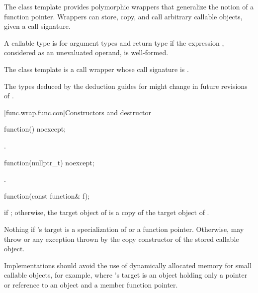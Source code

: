 \pnum
The  class template provides polymorphic wrappers that
generalize the notion of a function pointer. Wrappers can store, copy,
and call arbitrary callable objects, given a call
signature.

\pnum
{}%
A callable type 
is  for argument
types 
and return type 
if the expression
,
considered as an unevaluated operand, is
well-formed.

\pnum
The  class template is a call
wrapper whose call signature
is .

\pnum
\begin{note}
The types deduced by the deduction guides for 
might change in future revisions of \Cpp{}.
\end{note}

[func.wrap.func.con]{Constructors and destructor}

%
\begin{itemdecl}
function() noexcept;
\end{itemdecl}

\begin{itemdescr}
\pnum
\ensures
{}.
\end{itemdescr}

%
\begin{itemdecl}
function(nullptr_t) noexcept;
\end{itemdecl}

\begin{itemdescr}
\pnum
\ensures
{}.
\end{itemdescr}

%
\begin{itemdecl}
function(const function& f);
\end{itemdecl}

\begin{itemdescr}
\pnum
\ensures
{} if ; otherwise,
the target object of  is a copy of the target object of .

\pnum
\throws
Nothing if 's target is
a specialization of  or
a function pointer. Otherwise, may throw 
or any exception thrown by the copy constructor of the stored callable object.

\pnum
\recommended
Implementations should avoid the use of
dynamically allocated memory for small callable objects, for example, where
's target is an object holding only a pointer or reference
to an object and a member function pointer.
\end{itemdescr}

